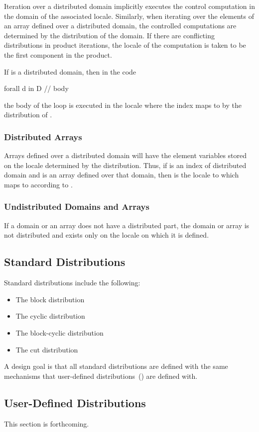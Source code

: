 Iteration over a distributed domain implicitly executes the control
computation in the domain of the associated locale.  Similarly, when
iterating over the elements of an array defined over a distributed
domain, the controlled computations are determined by the distribution
of the domain.  If there are conflicting distributions in product
iterations, the locale of the computation is taken to be the first
component in the product.

\begin{example}
If  is a distributed domain, then in the code
\begin{chapel}
forall d in D {
  // body
}
\end{chapel}
the body of the loop is executed in the locale where the
index  maps to by the distribution of .
\end{example}

\subsubsection{Distributed Arrays}
\label{Distributed_Arrays}

Arrays defined over a distributed domain will have the element
variables stored on the locale determined by the distribution.  Thus,
if  is an index of distributed domain  and  is
an array defined over that domain, then  is the
locale to which  maps to according to .

\subsubsection{Undistributed Domains and Arrays}
\label{Undistributed_Domains_and_Arrays}

If a domain or an array does not have a distributed part, the domain
or array is not distributed and exists only on the locale on which it
is defined.

\subsection{Standard Distributions}
\label{Standard_Distributions}

Standard distributions include the following:
\begin{itemize}
\item The block distribution 
\item The cyclic distribution 
\item The block-cyclic distribution 
\item The cut distribution 
\end{itemize}

A design goal is that all standard distributions are defined with the
same mechanisms that user-defined
distributions~() are defined with.

\subsection{User-Defined Distributions}
\label{User_Defined_Distributions}

This section is forthcoming.
